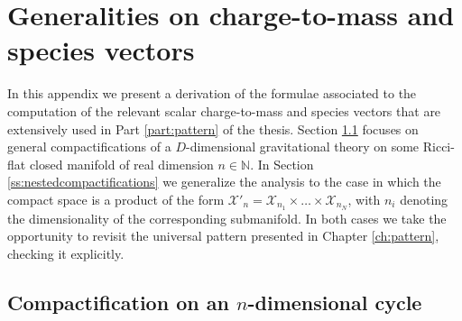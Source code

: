 \chapter{Generalities on charge-to-mass and species vectors}
\label{ap:generalities}

In this appendix we present a derivation of the formulae associated to the computation of the relevant scalar charge-to-mass and species vectors that are extensively used in Part \ref{part:pattern} of the thesis. Section \ref{s:compactificationNmfd} focuses on general compactifications of a $D$-dimensional gravitational theory on some Ricci-flat closed manifold of real dimension $n\in \mathbb{N}$. In Section \ref{ss:nestedcompactifications} we generalize the analysis to the case in which the compact space is a product of the form $\mathcal{X}'_n=\mathcal{X}_{n_1}\times \ldots \times\mathcal{X}_{n_N}$, with $n_i$ denoting the dimensionality of the corresponding submanifold. In both cases we take the opportunity to revisit the universal pattern presented in Chapter \ref{ch:pattern}, checking it explicitly.
	
\section{Compactification on an $n$-dimensional cycle}\label{s:compactificationNmfd}
	
